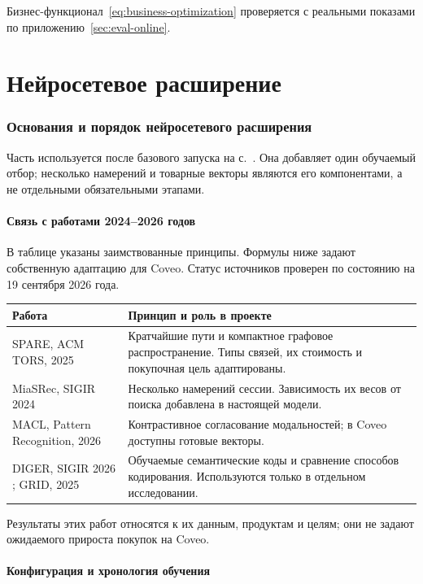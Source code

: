 \documentclass[12pt,a4paper]{article}
\theoremstyle{plainru}
\begin{document}
Бизнес-функционал~\eqref{eq:business-optimization} проверяется
с реальными показами по приложению~\ref{sec:eval-online}.

\clearpage\part{Нейросетевое расширение}\label{part:neural}
\section{Основания и порядок нейросетевого расширения}\label{sec:research}

Часть используется после базового запуска на с.~\pageref{sec:first-run}.
Она добавляет один обучаемый отбор; несколько намерений и товарные
векторы являются его компонентами, а не отдельными обязательными этапами.

\subsection{Связь с работами 2024--2026 годов}

В таблице указаны заимствованные принципы. Формулы ниже задают
собственную адаптацию для Coveo. Статус источников проверен
по состоянию на 19 сентября 2026 года.

\begin{longtable}{L{0.26\textwidth}L{0.64\textwidth}}
\toprule Работа & Принцип и роль в проекте \\\midrule\endhead
SPARE, ACM TORS, 2025 \cite{spare2025} &
Кратчайшие пути и компактное графовое распространение.
Типы связей, их стоимость и покупочная цель адаптированы. \\
MiaSRec, SIGIR 2024 \cite{miasrec2024} &
Несколько намерений сессии. Зависимость их весов от поиска
добавлена в настоящей модели. \\
MACL, Pattern Recognition, 2026 \cite{macl2025} &
Контрастивное согласование модальностей; в Coveo доступны готовые
векторы. \\
DIGER, SIGIR 2026 \cite{diger2026}; GRID, 2025 \cite{grid2025} &
Обучаемые семантические коды и сравнение способов кодирования.
Используются только в отдельном исследовании. \\
\bottomrule
\end{longtable}

Результаты этих работ относятся к их данным, продуктам и целям;
они не задают ожидаемого прироста покупок на Coveo.

\subsection{Конфигурация и хронология обучения}
\end{document}

